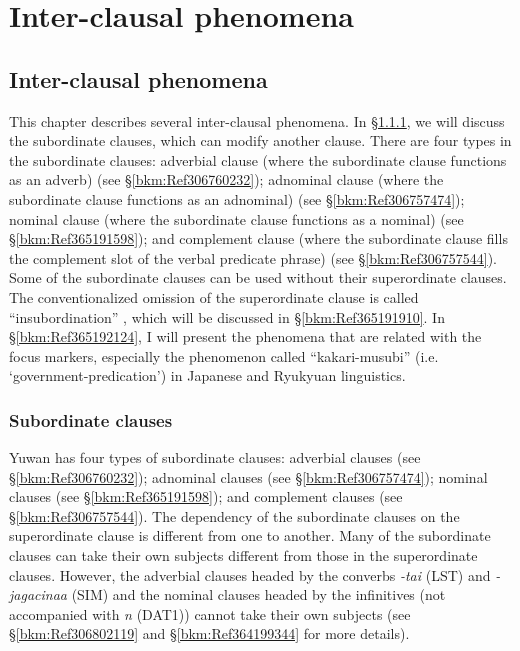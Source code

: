 \chapter{Inter-clausal phenomena}\label{chap:11}

\section{Inter-clausal phenomena}
\hypertarget{RefHeadingToc395697250}{}
This chapter describes several inter-clausal phenomena. In §\ref{bkm:Ref365191373}, we will discuss the subordinate clauses, which can modify another clause. There are four types in the subordinate clauses: adverbial clause (where the subordinate clause functions as an adverb) (see §\ref{bkm:Ref306760232}); adnominal clause (where the subordinate clause functions as an adnominal) (see §\ref{bkm:Ref306757474}); nominal clause (where the subordinate clause functions as a nominal) (see §\ref{bkm:Ref365191598}); and complement clause (where the subordinate clause fills the complement slot of the verbal predicate phrase) (see §\ref{bkm:Ref306757544}). Some of the subordinate clauses can be used without their superordinate clauses. The conventionalized omission of the superordinate clause is called “insubordination” \citep{Evans2007}, which will be discussed in §\ref{bkm:Ref365191910}. In §\ref{bkm:Ref365192124}, I will present the phenomena that are related with the focus markers, especially the phenomenon called “kakari-musubi” (i.e. ‘government-predication’) in Japanese and Ryukyuan linguistics.

\subsection{Subordinate clauses}
\label{bkm:Ref365191373}\hypertarget{RefHeadingToc395697251}{}
Yuwan has four types of subordinate clauses: adverbial clauses (see §\ref{bkm:Ref306760232}); adnominal clauses (see §\ref{bkm:Ref306757474}); nominal clauses (see §\ref{bkm:Ref365191598}); and complement clauses (see §\ref{bkm:Ref306757544}). The dependency of the subordinate clauses on the superordinate clause is different from one to another. Many of the subordinate clauses can take their own subjects different from those in the superordinate clauses. However, the adverbial clauses headed by the converbs \textit{{}-tai} (LST) and \textit{{}-jagacinaa} (SIM) and the nominal clauses headed by the infinitives (not accompanied with \textit{n} (DAT1)) cannot take their own subjects (see §\ref{bkm:Ref306802119} and §\ref{bkm:Ref364199344} for more details).

